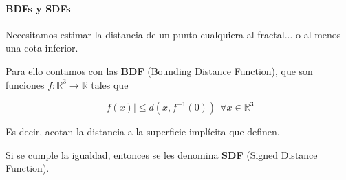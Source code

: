 \begin{frame}{\insertsectionhead}
\framesubtitle{BDFs y SDFs}
{\large 
Necesitamos estimar la distancia de un punto cualquiera al fractal... o al menos una cota inferior.

\pause

Para ello contamos con las \textbf{BDF} (Bounding Distance Function), que son funciones $f:\mathbb R^3\longrightarrow \mathbb R$ tales que

$$
|f(x)|\leq d(x,f^{-1}(0)) \ \ \forall x\in\mathbb R^3
$$

Es decir, acotan la distancia a la superficie implícita que definen.

Si se cumple la igualdad, entonces se les denomina \textbf{SDF} (Signed Distance Function).
}
\end{frame}

